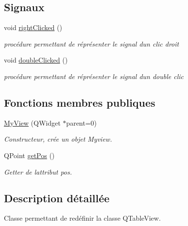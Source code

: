 \subsection*{Signaux}
\begin{DoxyCompactItemize}
\item 
void \hyperlink{class_my_view_a94a8e0854d7c5b07f71c9ab71bf2bb56}{right\+Clicked} ()\hypertarget{class_my_view_a94a8e0854d7c5b07f71c9ab71bf2bb56}{}\label{class_my_view_a94a8e0854d7c5b07f71c9ab71bf2bb56}

\begin{DoxyCompactList}\small\item\em procédure permettant de réprésenter le signal d\textquotesingle{}un clic droit \end{DoxyCompactList}\item 
void \hyperlink{class_my_view_a845fd0cc0f988e65060d3eb367584583}{double\+Clicked} ()\hypertarget{class_my_view_a845fd0cc0f988e65060d3eb367584583}{}\label{class_my_view_a845fd0cc0f988e65060d3eb367584583}

\begin{DoxyCompactList}\small\item\em procédure permettant de réprésenter le signal d\textquotesingle{}un double clic \end{DoxyCompactList}\end{DoxyCompactItemize}
\subsection*{Fonctions membres publiques}
\begin{DoxyCompactItemize}
\item 
\hyperlink{class_my_view_ad3d369abeec4aedbe6701cb4452eb8c4}{My\+View} (Q\+Widget $\ast$parent=0)
\begin{DoxyCompactList}\small\item\em Constructeur, crée un objet Myview. \end{DoxyCompactList}\item 
Q\+Point \hyperlink{class_my_view_a55c1b10748589b3c32d2c03a175edbe5}{get\+Pos} ()
\begin{DoxyCompactList}\small\item\em Getter de l\textquotesingle{}attribut pos. \end{DoxyCompactList}\end{DoxyCompactItemize}


\subsection{Description détaillée}
Classe permettant de redéfinir la classe Q\+Table\+View. 

